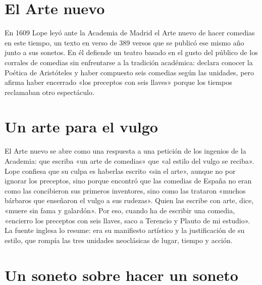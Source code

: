 \documentclass{book}
\begin{document}

\section{El Arte nuevo}

En 1609 Lope leyó ante la Academia de Madrid el Arte nuevo de hacer comedias en este tiempo, un texto en verso de 389 versos que se publicó ese mismo año junto a sus sonetos. En él defiende un teatro basado en el gusto del público de los corrales de comedias sin enfrentarse a la tradición académica: declara conocer la Poética de Aristóteles y haber compuesto seis comedias según las unidades, pero afirma haber encerrado «los preceptos con seis llaves» porque los tiempos reclamaban otro espectáculo.


\section{Un arte para el vulgo}

El Arte nuevo se abre como una respuesta a una petición de los ingenios de la Academia: que escriba «un arte de comedias» que «al estilo del vulgo se reciba». Lope confiesa que su culpa es haberlas escrito «sin el arte», aunque no por ignorar los preceptos, sino porque encontró que las comedias de España no eran como las concibieron sus primeros inventores, sino como las trataron «muchos bárbaros que enseñaron el vulgo a sus rudezas». Quien las escribe con arte, dice, «muere sin fama y galardón». Por eso, cuando ha de escribir una comedia, «encierro los preceptos con seis llaves, saco a Terencio y Plauto de mi estudio». La fuente inglesa lo resume: era su manifiesto artístico y la justificación de su estilo, que rompía las tres unidades neoclásicas de lugar, tiempo y acción.


\section{Un soneto sobre hacer un soneto}
\end{document}
